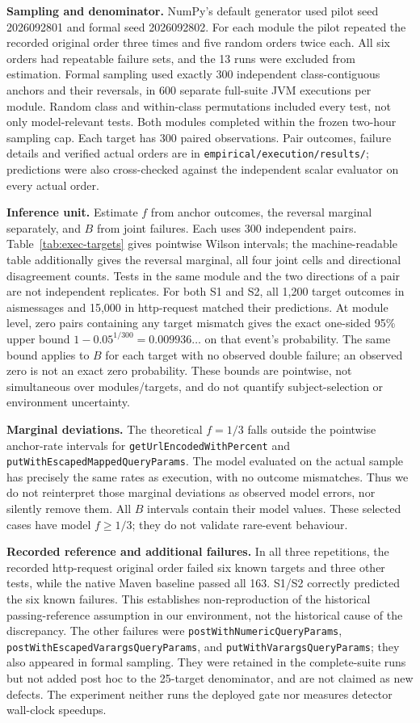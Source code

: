 \documentclass[11pt,a4paper]{article}
\theoremstyle{definition}\newtheorem{definition}[theorem]{Definition}
\theoremstyle{remark}\newtheorem{remark}[theorem]{Remark}
\theoremstyle{definition}\newtheorem{xexample}[xtheorem]{Example}\theoremstyle{plain}
\begin{document}
\textbf{Sampling and denominator.} NumPy's default generator used pilot seed
2026092801 and formal seed 2026092802. For each module the pilot repeated the
recorded original order three times and five random orders twice each. All six
orders had repeatable failure sets, and the 13 runs were excluded from estimation.
Formal sampling used exactly 300 independent class-contiguous anchors and their
reversals, in 600 separate full-suite JVM executions per module. Random class and
within-class permutations included every test, not only model-relevant tests.
Both modules completed within the frozen two-hour sampling cap. Each target has
300 paired observations. Pair outcomes, failure details and verified actual orders
are in \texttt{empirical/execution/results/}; predictions were also cross-checked
against the independent scalar evaluator on every actual order.

\textbf{Inference unit.} Estimate $f$ from anchor outcomes, the reversal marginal
separately, and $B$ from joint failures. Each uses 300 independent pairs. Table~\ref{tab:exec-targets}
gives pointwise Wilson intervals; the machine-readable table additionally gives
the reversal marginal, all four joint cells and directional disagreement counts.
Tests in the same module and the two directions of a pair are not independent
replicates. For both S1 and S2, all 1,200 target outcomes in aismessages and 15,000
in http-request matched their predictions. At module level, zero pairs containing
any target mismatch gives the exact one-sided 95\% upper bound
$1-0.05^{1/300}=0.009936\ldots$ on that event's probability. The same bound applies
to $B$ for each target with no observed double failure; an observed zero is not
an exact zero probability. These bounds are pointwise, not simultaneous over
modules/targets, and do not quantify subject-selection or environment uncertainty.

\textbf{Marginal deviations.} The theoretical $f=1/3$ falls outside the pointwise
anchor-rate intervals for \texttt{getUrlEncodedWithPercent} and
\texttt{putWithEscapedMappedQueryParams}. The model evaluated on the actual
sample has precisely the same rates as execution, with no outcome mismatches.
Thus we do not reinterpret those marginal deviations as observed model errors,
nor silently remove them. All $B$ intervals contain their model values. These
selected cases have model $f\ge1/3$; they do not validate rare-event behaviour.

\textbf{Recorded reference and additional failures.} In all three repetitions,
the recorded http-request original order failed six known targets and three other
tests, while the native Maven baseline passed all 163. S1/S2 correctly predicted
the six known failures. This establishes non-reproduction of the historical
passing-reference assumption in our environment, not the historical cause of the
discrepancy. The other failures were \texttt{postWithNumericQueryParams},
\texttt{postWithEscapedVarargsQueryParams}, and \texttt{putWithVarargsQueryParams};
they also appeared in formal sampling. They were retained in the complete-suite
runs but not added post hoc to the 25-target denominator, and are not claimed as
new defects. The experiment neither runs the deployed gate nor measures detector
wall-clock speedups.
\end{document}
